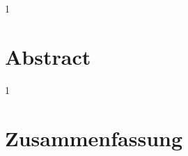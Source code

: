 \begin{spacing}{1}
    \chapter*{Abstract}
\end{spacing}


\newpage
\begin{spacing}{1}
    \chapter*{Zusammenfassung}
\end{spacing}

